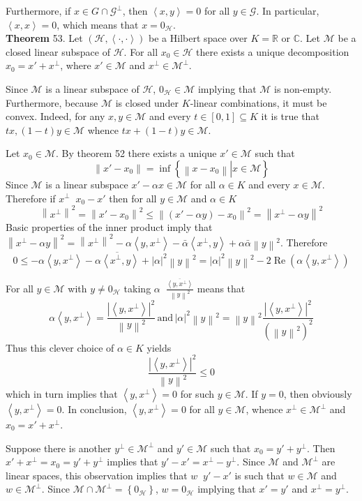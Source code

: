 \documentclass[a4paper]{article}
\newcommand{\obj}[1]{\left\{ #1 \right \}}
\newcommand{\clo}[1]{\left [ #1 \right ]}
\newcommand{\brac}[1]{\left ( #1 \right )}
\newcommand{\induc}[1]{\left . #1 \right \vert}
\newcommand{\abs}[1]{\left | #1 \right |}
\newcommand{\nrm}[1]{\left\| #1 \right \|}
\newcommand{\brkt}[1]{\left\langle #1 \right\rangle}
\newcommand{\Real}{\mathbb{R}}
\newcommand{\Cplx}{\mathbb{C}}
\newcommand{\Hcal}{\mathcal{H}}
\newcommand{\Mcal}{\mathcal{M}}
\newcommand{\defn}{\mathop{\overset{\Delta}{=}}\nolimits}
\newcommand{\re}{\operatorname{Re}\nolimits}
\begin{document}
Furthermore, if $x\in G\cap \mathcal{G}^\perp$, then $\brkt{x,y}=0$ for all $y\in \mathcal{G}$. In particular, $\brkt{x,x}=0$, which means that $x=0_\Hcal$.\\

\label{thm:subspace_decomposition} \noindent \textbf{Theorem} 53.
Let $\brac{\Hcal, \brkt{\cdot, \cdot}}$ be a Hilbert space over $K=\Real$ or $\Cplx$. Let $\Mcal$ be a closed linear subspace of $\Hcal$. For all $x_0\in \Hcal$ there exists a unique decomposition $x_0 = x' + x^\perp$, where $x'\in \Mcal$ and $x^\perp\in \Mcal^\perp$.

Since $\Mcal$ is a linear subspace of $\Hcal$, $0_\Hcal\in \Mcal$ implying that $\Mcal$ is non-empty. Furthermore, because $\Mcal$ is closed under $K$-linear combinations, it must be convex. Indeed, for any $x,y\in \Mcal$ and every $t\in \clo{0,1}\subseteq K$ it is true that $t x, \brac{1-t} y\in \Mcal$ whence $t x + \brac{1-t} y\in \Mcal$.

Let $x_0\in \Mcal$. By theorem 52 there exists a unique $x'\in \Mcal$ such that \[\nrm{x'-x_0} = \inf\obj{ \induc{\nrm{x - x_0}} x\in \Mcal }\] Since $\Mcal$ is a linear subspace $x'-\alpha x\in \Mcal$ for all $\alpha\in K$ and every $x\in\Mcal$. Therefore if $x^\perp \defn x_0 - x'$ then for all $y\in\Mcal$ and $\alpha\in K$ \[\nrm{x^\perp}^2=\nrm{x'-x_0}^2\leq \nrm{\brac{x' - \alpha y} - x_0}^2 = \nrm{x^\perp - \alpha y}^2\]Basic properties of the inner product imply that $\nrm{x^\perp - \alpha y}^2 = \nrm{x^\perp}^2 - \alpha \brkt{y,x^\perp} - \bar{\alpha} \brkt{x^\perp,y}+\alpha\bar{\alpha}\nrm{y}^2$. Therefore \[0\leq  - \alpha \brkt{y,x^\perp} - \overline{\alpha\brkt{x^\perp,y}}+\abs{\alpha}^2 \nrm{y}^2 = \abs{\alpha}^2 \nrm{y}^2 - 2\re\brac{\alpha \brkt{y,x^\perp}}\]

For all $y\in \Mcal$ with $y\neq 0_\Hcal$ taking $\alpha \defn \frac{\overline{\brkt{y,x^\perp}}}{\nrm{y}^2}$ means that \[\alpha \brkt{y,x^\perp} = \frac{\abs{\brkt{y,x^\perp}}^2}{\nrm{y}^2}\,\text{and}\,\abs{\alpha}^2 \nrm{y}^2 = \nrm{y}^2 \frac{\abs{\brkt{y,x^\perp}}^2}{\brac{\nrm{y}^2}^2} \] Thus this clever choice of $\alpha\in K$ yields \[\frac{\abs{\brkt{y,x^\perp}}^2}{\nrm{y}^2} \leq 0\] which in turn implies that $\brkt{y,x^\perp} = 0$ for such $y\in \Mcal$. If $y=0$, then obviously $\brkt{y,x^\perp}=0$. In conclusion, $\brkt{y,x^\perp}=0$ for all $y\in \Mcal$, whence $x^\perp\in \Mcal^\perp$ and $x_0 = x' + x^\perp$.

Suppose there is another $y^\perp\in \Mcal^\perp$ and $y'\in \Mcal$ such that $x_0 = y' + y^\perp$. Then $x' + x^\perp = x_0 = y' + y^\perp$ implies that $y'-x' = x^\perp - y^\perp$. Since $\Mcal$ and $\Mcal^\perp$ are linear spaces, this observation implies that $w \defn y'-x'$ is such that $w\in \Mcal$ and $w\in \Mcal^\perp$. Since $\Mcal\cap \Mcal^\perp = \obj{0_\Hcal}$, $w=0_\Hcal$ implying that $x' = y'$ and $x^\perp = y^\perp$.
\end{document}
